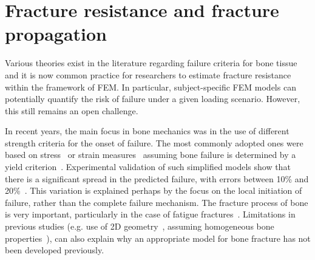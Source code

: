 \documentclass[onecolumn]{svjour3}
\begin{document}
% 
% 
% 
\section{Fracture resistance and fracture propagation}
\label{sec:fracture}
Various theories exist in the literature regarding failure criteria for bone tissue and it is now common practice for researchers to estimate fracture resistance within the framework of FEM. In particular, subject-specific FEM models can potentially quantify the risk of failure under a given loading scenario. However, this still remains an open challenge.

In recent years, the main focus in bone mechanics was in the use of different strength criteria for the onset of failure. 
The most commonly adopted ones were based on stress~\cite{keyak2005predicting} or strain measures~\cite{schileo2008subject} assuming bone failure is determined by a yield criterion~\cite{yosibash2010predicting}. 
Experimental validation of such simplified models show that there is a significant spread in the predicted failure, with errors between 10\% and 20\%~\cite{van2014accurately}.
This variation is explained perhaps by the focus on the local initiation of failure, rather than the complete failure mechanism. 
The fracture process of bone is very important,  particularly in the case of fatigue fractures~\cite{gupta2008fracture}. 
Limitations in previous studies (e.g. use of 2D geometry~\cite{bettamer2017using}, assuming homogeneous bone properties~\cite{gasser2007numerical}), 
can also explain why an appropriate model for bone fracture has not been developed previously.
\end{document}
